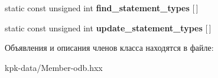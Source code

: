 \begin{DoxyCompactItemize}
\item 
static const unsigned int {\bfseries find\+\_\+statement\+\_\+types} \mbox{[}$\,$\mbox{]}\hypertarget{classodb_1_1access_1_1object__traits__impl_3_01_1_1kpk_1_1data_1_1_member_00_01id__pgsql_01_4_a0b024e28e06bc51c364bc949a4e4c233}{}\label{classodb_1_1access_1_1object__traits__impl_3_01_1_1kpk_1_1data_1_1_member_00_01id__pgsql_01_4_a0b024e28e06bc51c364bc949a4e4c233}

\item 
static const unsigned int {\bfseries update\+\_\+statement\+\_\+types} \mbox{[}$\,$\mbox{]}\hypertarget{classodb_1_1access_1_1object__traits__impl_3_01_1_1kpk_1_1data_1_1_member_00_01id__pgsql_01_4_a48d444e6bb1b95bcfaedf588bc49fb04}{}\label{classodb_1_1access_1_1object__traits__impl_3_01_1_1kpk_1_1data_1_1_member_00_01id__pgsql_01_4_a48d444e6bb1b95bcfaedf588bc49fb04}

\end{DoxyCompactItemize}


Объявления и описания членов класса находятся в файле\+:\begin{DoxyCompactItemize}
\item 
kpk-\/data/Member-\/odb.\+hxx\end{DoxyCompactItemize}

